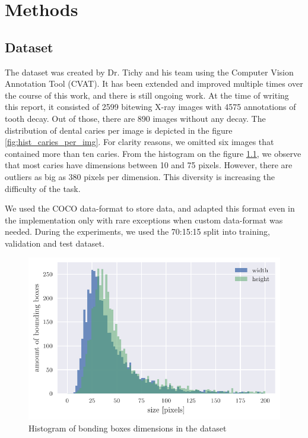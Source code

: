 \chapter{Methods}
\label{chapter:methods}
\section{Dataset}
The dataset was created by Dr. Tichy and his team using the Computer Vision Annotation Tool (CVAT). It has been extended and improved multiple times over the course of this work, and there is still ongoing work. At the time of writing this report, it consisted of 2599 bitewing X-ray images with 4575 annotations of tooth decay. Out of those, there are 890 images without any decay. The distribution of dental caries per image is depicted in the figure \ref{fig:hist_caries_per_img}. For clarity reasons, we omitted six images that contained more than ten caries. From the histogram on the figure \ref{fig:hist_caries_dim}, we observe that most caries have dimensions between 10 and 75 pixels. However, there are outliers as big as 380 pixels per dimension. This diversity is increasing the difficulty of the task.

We used the COCO data-format to store data, and adapted this format even in the implementation only with rare exceptions when custom data-format was needed. During the experiments, we used the 70:15:15 split into training, validation and test dataset.
\begin{figure}
    \includegraphics[width = \linewidth]{images/dataset_histogram.pdf}
    \caption{Histogram of bonding boxes dimensions in the dataset}
    \label{fig:hist_caries_dim}
\end{figure}

